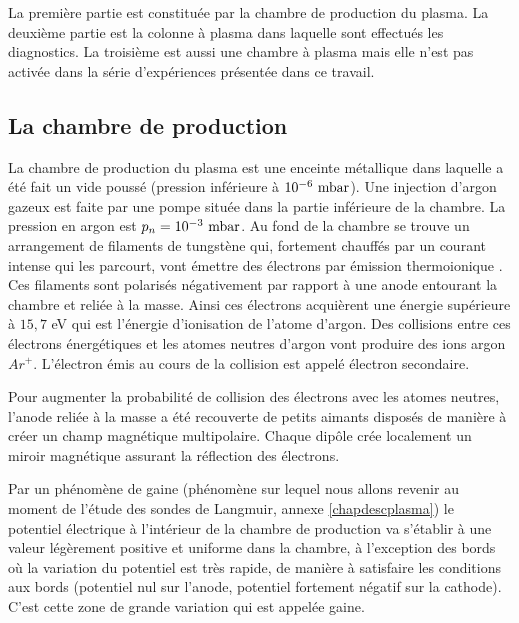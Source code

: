 \documentclass{book}
\begin{document}
La premi\`ere partie est constitu\'ee par la chambre de production
du plasma. La deuxi\`eme partie est la colonne \`a plasma dans laquelle
sont effectu\'es les diagnostics. La troisi\`eme est aussi une 
chambre \`a plasma mais elle n'est pas activ\'ee dans la s\'erie
d'exp\'eriences pr\'esent\'ee dans ce travail.

\subsection{La chambre de production}
La chambre de production du plasma est une enceinte m\'etallique dans
laquelle a \'et\'e fait un vide pouss\'e (pression inf\'erieure \`a $10^{-6}\ {\rm
mbar}$). Une injection d'argon gazeux est faite par une pompe
situ\'ee dans la partie inf\'erieure de la chambre. La pression en argon
est $p_n=10^{-3}\ {\rm mbar}$. Au fond de la chambre se trouve un
arrangement de filaments de tungst\`ene qui, fortement chauff\'es 
par un courant intense qui les parcourt,
vont \'emettre des \'electrons par
\'emission 
thermoionique
\cite{Kittel67,Ashcroft76}. 
Ces filaments sont polaris\'es n\'egativement par rapport \`a une anode
entourant la chambre et reli\'ee \`a la masse. Ainsi ces \'electrons
acqui\`erent une \'energie sup\'erieure \`a $15,7$ eV qui est l'\'energie
d'ionisation de l'atome d'argon. Des collisions entre ces \'electrons
\'energ\'etiques et les atomes neutres d'argon vont produire des ions
argon $Ar^+$. L'\'electron \'emis au cours de la collision est appel\'e
\'electron secondaire.

Pour augmenter la probabilit\'e de collision des \'electrons avec les
ato\-mes neu\-tres, l'anode reli\'ee \`a la masse a \'et\'e
recouverte de petits 
aimants  dispos\'es de mani\`ere \`a cr\'eer un champ magn\'etique
multipolaire. Chaque dip\^ole  cr\'ee localement un miroir
magn\'etique \cite{Limpaecher73} assurant la
r\'eflection des \'electrons.  

Par un ph\'enom\`ene de gaine (ph\'enom\`ene
\cite{Chen84} sur lequel nous 
allons revenir  
au moment de l'\'etude des sondes de Langmuir, annexe
\ref{chapdescplasma})  le potentiel 
\'electrique \`a 
l'int\'erieur de la chambre de production va s'\'etablir \`a une valeur
l\'eg\`erement positive et uniforme dans la chambre, \`a l'exception
des bords o\`u la variation du potentiel est tr\`es rapide, de
mani\`ere \`a 
satisfaire les conditions aux bords (potentiel nul sur l'anode,
potentiel fortement n\'egatif sur la cathode). C'est cette zone de grande
variation qui est appel\'ee
 gaine.
\end{document}

